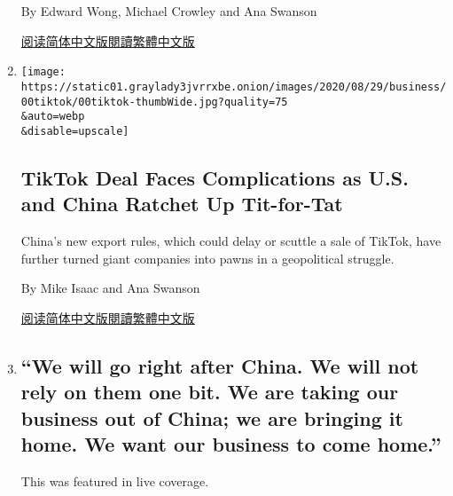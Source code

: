 \begin{enumerate}
  By Edward Wong, Michael Crowley and Ana Swanson

  \href{https://cn.nytimes3xbfgragh.onion/usa/20200908/biden-china/}{阅读简体中文版}\href{https://cn.nytimes3xbfgragh.onion/usa/20200908/biden-china/zh-hant/}{閱讀繁體中文版}
\item
  \href{/2020/08/31/technology/tiktok-export-us-china.html}{}

  \texttt{[image: https://static01.graylady3jvrrxbe.onion/images/2020/08/29/business/00tiktok/00tiktok-thumbWide.jpg?quality=75\\\&auto=webp\\\&disable=upscale]}

  \hypertarget{tiktok-deal-faces-complications-as-us-and-china-ratchet-up-tit-for-tat}{%
  \subsection{TikTok Deal Faces Complications as U.S. and China Ratchet
  Up
  Tit-for-Tat}\label{tiktok-deal-faces-complications-as-us-and-china-ratchet-up-tit-for-tat}}

  China's new export rules, which could delay or scuttle a sale of
  TikTok, have further turned giant companies into pawns in a
  geopolitical struggle.

  By Mike Isaac and Ana Swanson

  \href{https://cn.nytimes3xbfgragh.onion/technology/20200901/tiktok-export-us-china/}{阅读简体中文版}\href{https://cn.nytimes3xbfgragh.onion/technology/20200901/tiktok-export-us-china/zh-hant/}{閱讀繁體中文版}
\item
  \href{/live/2020/08/27/us/rnc-fact-check/we-will-go-right-after-china-we-will-not-rely-on-them-one-bit-we-are-taking-our-business-out-of-china-we-are-bringing-it-home-we}{}

  \hypertarget{we-will-go-right-after-china-we-will-not-rely-on-them-one-bit-we-are-taking-our-business-out-of-china-we-are-bringing-it-home-we-want-our-business-to-come-home}{%
  \subsection{``We will go right after China. We will not rely on them
  one bit. We are taking our business out of China; we are bringing it
  home. We want our business to come
  home.''}\label{we-will-go-right-after-china-we-will-not-rely-on-them-one-bit-we-are-taking-our-business-out-of-china-we-are-bringing-it-home-we-want-our-business-to-come-home}}

  This was featured in live coverage.


\end{enumerate}
